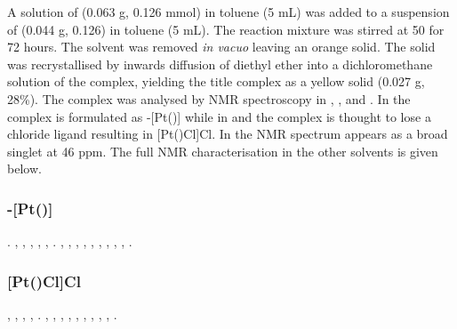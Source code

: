 A solution of \tBuxantphos{} (0.063 g, 0.126 mmol) in toluene (5 mL) was added to a suspension of \ce{[Pt(C6H10)Cl2]} (0.044 g, 0.126) in toluene (5 mL).  The reaction mixture was stirred at 50 \degC{} for 72 hours.  The solvent was removed \emph{in vacuo} leaving an orange solid.  The solid was recrystallised by inwards diffusion of diethyl ether into a dichloromethane solution of the complex, yielding the title complex as a yellow solid (0.027 g, 28\%).  The complex was analysed by NMR spectroscopy in , ,  and .  In  the complex is formulated as \trans-[Pt(\tBuxantphos)] while in  and  the complex is thought to lose a chloride ligand resulting in [Pt(\tBuxantphosk)Cl]Cl.  In  the \phosphorus{} NMR spectrum appears as a broad singlet at 46 ppm.  The full NMR characterisation in the other solvents is given below.  

\subsubsection{\trans-[Pt(\tBuxantphos)]}

.
,
,
,
,
,
.
,
,
,
,
,
,
,
,
,
.

\subsubsection{[Pt(\tBuxantphosk)Cl]Cl}

,
,
,
,
.
,
,
,
,
,
,
,
,
,
.

